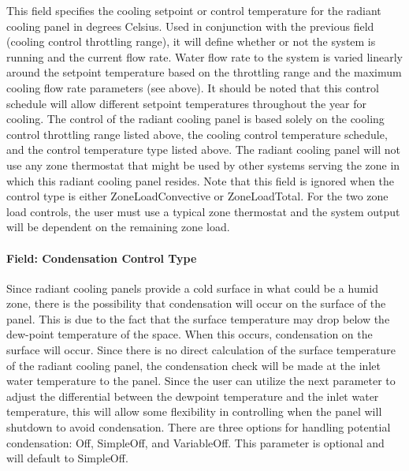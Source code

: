 This field specifies the cooling setpoint or control temperature for the radiant cooling panel in degrees Celsius. Used in conjunction with the previous field (cooling control throttling range), it will define whether or not the system is running and the current flow rate. Water flow rate to the system is varied linearly around the setpoint temperature based on the throttling range and the maximum cooling flow rate parameters (see above). It should be noted that this control schedule will allow different setpoint temperatures throughout the year for cooling. The control of the radiant cooling panel is based solely on the cooling control throttling range listed above, the cooling control temperature schedule, and the control temperature type listed above. The radiant cooling panel will not use any zone thermostat that might be used by other systems serving the zone in which this radiant cooling panel resides.  Note that this field is ignored when the control type is either ZoneLoadConvective or ZoneLoadTotal.  For the two zone load controls, the user must use a typical zone thermostat and the system output will be dependent on the remaining zone load.

\paragraph{Field: Condensation Control Type}\label{field-condensation-control-type}

Since radiant cooling panels provide a cold surface in what could be a humid zone, there is the possibility that condensation will occur on the surface of the panel. This is due to the fact that the surface temperature may drop below the dew-point temperature of the space. When this occurs, condensation on the surface will occur. Since there is no direct calculation of the surface temperature of the radiant cooling panel, the condensation check will be made at the inlet water temperature to the panel. Since the user can utilize the next parameter to adjust the differential between the dewpoint temperature and the inlet water temperature, this will allow some flexibility in controlling when the panel will shutdown to avoid condensation. There are three options for handling potential condensation: Off, SimpleOff, and VariableOff. This parameter is optional and will default to SimpleOff.

